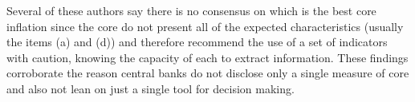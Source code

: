 \documentclass[10pt]{article}
\begin{document}

Several of these authors say there is no consensus on which is the best core inflation since the core do not present all of the expected characteristics (usually the items (a) and (d)) and therefore recommend the use of a set of indicators with caution, knowing the capacity of each to extract information. These findings corroborate the reason central banks do not disclose only a single measure of core and also not lean on just a single tool for decision making.
\end{document}
